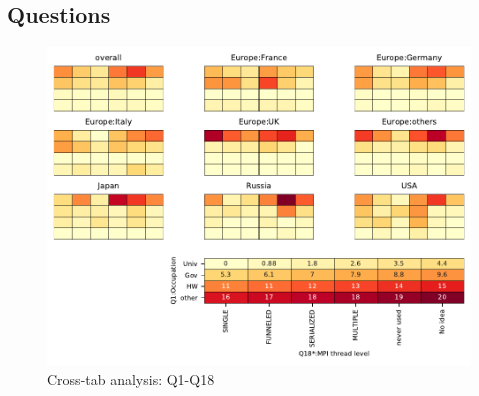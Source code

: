 
\subsection{Questions}


\begin{figure}
\begin{center}
\includegraphics[width=12cm]{../pdfs/Q1-Q18.pdf}
\caption{Cross-tab analysis: Q1-Q18}
\label{fig:Q1-Q18}
\end{center}
\end{figure}
